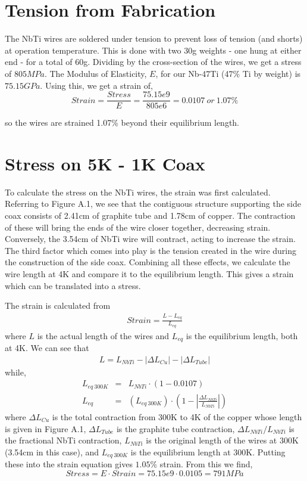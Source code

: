 \documentclass{report}
\begin{document}
\begin{appendices}
\section{Tension from Fabrication}

The NbTi wires are soldered under tension to prevent loss of tension (and shorts) at operation temperature. This is done with two 30g weights - one hung at either end - for a total of 60g. Dividing by the cross-section of the wires, we get a stress of $805MPa$. The Modulus of Elasticity, $E$, for our Nb-47Ti (47\% Ti by weight) is $75.15GPa$. Using this, we get a strain of,
$$
Strain = \frac{Stress}{E} = \frac{75.15e9}{805e6} = 0.0107 \ or \ 1.07\%
$$

so the wires are strained 1.07\% beyond their equilibrium length.

\section{Stress on 5K - 1K Coax}

To calculate the stress on the NbTi wires, the strain was first calculated. Referring to Figure A.1, we see that the contiguous structure supporting the side coax consists of 2.41cm of graphite tube and 1.78cm of copper. The contraction of these will bring the ends of the wire closer together, decreasing strain. Conversely, the 3.54cm of NbTi wire will contract, acting to increase the strain. The third factor which comes into play is the tension created in the wire during the construction of the side coax. Combining all these effects, we calculate the wire length at 4K and compare it to the equilibrium length. This gives a strain which can be translated into a stress.

The strain is calculated from
\begin{eqnarray}
Strain = \frac{L - L_{eq}}{L_{eq}}
\end{eqnarray}
where $L$ is the actual length of the wires and $L_{eq}$ is the equilibrium length, both at 4K. We can see that
\begin{eqnarray}
L = L_{NbTi} - |\Delta L_{Cu}| - |\Delta L_{Tube}|
\end{eqnarray}
while,
\begin{eqnarray}
L_{eq \ 300K} & = & L_{NbTi} \cdot (1 - 0.0107) \\
L_{eq} & = & (L_{eq \ 300K})\cdot\left(1 - \left|\frac{\Delta L_{NbTi}}{L_{NbTi}}\right| \right)
\end{eqnarray}
where $\Delta L_{Cu}$ is the total contraction from 300K to 4K of the copper whose length is given in Figure A.1, $\Delta L_{Tube}$ is the graphite tube contraction, $\Delta L_{NbTi}/L_{NbTi}$ is the fractional NbTi contraction, $L_{NbTi}$ is the original length of the wires at 300K (3.54cm in this case), and $L_{eq \ 300K}$ is the equilibrium length at 300K. Putting these into the strain equation gives $1.05 \%$ strain. From this we find,
$$
Stress = E \cdot Strain = 75.15e9 \cdot 0.0105 = 791MPa
$$


\end{appendices}
\end{document}
